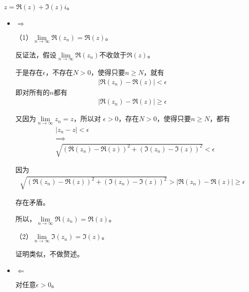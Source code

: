 \documentclass{article}
\begin{document}
$z = \mathfrak{R}(z) + \mathfrak{I}(z) i$。

\begin{itemize}
  \item $\Rightarrow$

        （1）$\lim\limits_{n \to \infty} \mathfrak{R} (z_n) = \mathfrak{R}(z)$。

        反证法，假设$\lim\limits_{n \to \infty} \mathfrak{R} (z_n)$不收敛于$\mathfrak{R}(z)$。

        于是存在$\epsilon$，不存在$N > 0$，使得只要$n \geq N$，就有
        \begin{align*}
          |\mathfrak{R} (z_n) - \mathfrak{R} (z) | < \epsilon
        \end{align*}
        即对所有的$n$都有
        \begin{align*}
          |\mathfrak{R} (z_n) - \mathfrak{R} (z) | \geq \epsilon
        \end{align*}

        又因为$\lim\limits_{n \to \infty} z_n = z$，所以对
        $\epsilon > 0$，存在$N > 0$，使得只要$n \geq N$，都有
        \begin{align*}
           & |z_n - z| < \epsilon                                                                                  \\
           & \implies                                                                                              \\
           & \sqrt{(\mathfrak{R} (z_n) - \mathfrak{R}(z))^2 + (\mathfrak{I} (z_n) - \mathfrak{I}(z))^2} < \epsilon
        \end{align*}

        因为
        \begin{align*}
          \sqrt{(\mathfrak{R} (z_n) - \mathfrak{R}(z))^2 + (\mathfrak{I} (z_n) - \mathfrak{I}(z))^2}
          > |\mathfrak{R} (z_n) - \mathfrak{R} (z) | \geq \epsilon
        \end{align*}

        存在矛盾。

        所以，$\lim\limits_{n \to \infty} \mathfrak{R} (z_n) = \mathfrak{R}(z)$。


        （2）$\lim\limits_{n \to \infty} \mathfrak{I} (z_n) = \mathfrak{I}(z)$。

        证明类似，不做赘述。

  \item $\Leftarrow$

        对任意$\epsilon > 0$。


\end{itemize}
\end{document}
